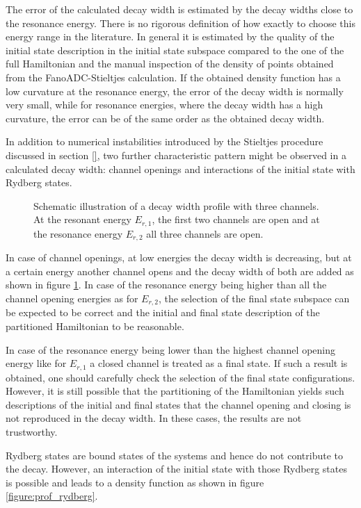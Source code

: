 The error of the calculated decay width is estimated by the decay widths
close to the resonance energy.
There is no rigorous definition
of how exactly to choose this energy range in the literature. 
In general it is estimated
by the quality of the initial state description in the initial
state subspace compared to the one of the full Hamiltonian and the
manual inspection of the density of points obtained
from the FanoADC-Stieltjes calculation. If
the obtained density function has a low curvature at the resonance energy,
the error of the decay width is normally very small, while for resonance
energies, where the decay width has a high curvature, the error can be of the same
order as the obtained decay width.

In addition to numerical instabilities introduced by the Stieltjes procedure
discussed in section \ref{},
two further characteristic pattern might be observed in a calculated
decay width: channel openings and interactions of the initial state
with Rydberg states.


\begin{figure}[h]
  \centering
  
  \caption{Schematic illustration of a decay width profile with three
           channels. At the resonant energy $E_{r,1}$, the first two channels
           are open and at the resonance energy $E_{r,2}$ all three channels
           are open.}
  \label{figure:prof_channel_opening}
\end{figure}
In case of channel openings, at low energies the decay width is decreasing, but
at a certain energy another channel opens and the decay width of both are
added as shown in figure \ref{figure:prof_channel_opening}. In case of the
resonance energy being higher than all the channel opening energies as for
$E_{r,2}$, the
selection of the final state subspace can be expected to be correct
and the initial
and final state description of the partitioned Hamiltonian to be reasonable.

In case of the resonance energy being lower than the highest channel
opening energy like for $E_{r,1}$ a closed channel is treated as a final
state. If such a result is obtained, one should carefully check the selection
of the final state configurations. However, it is still possible that the
partitioning of the Hamiltonian yields such descriptions of the initial and
final states that the channel opening and closing is not reproduced in the
decay width. In these cases, the results are not trustworthy.

Rydberg states are bound states of the systems and hence do not contribute
to the decay. However, an interaction of the initial state with those
Rydberg states is possible and leads to a density function as shown in
figure \ref{figure:prof_rydberg}.


